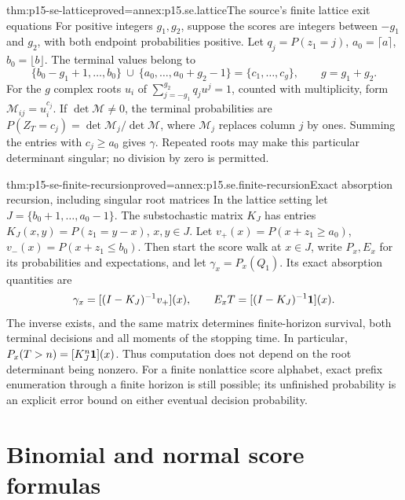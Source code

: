 \begin{hbtheorem}{thm:p15-se-lattice}{proved=annex:p15.se.lattice}{The source's finite lattice exit equations}
For positive integers \(g_1,g_2\), suppose the scores are integers
between \(-g_1\) and \(g_2\),
with both endpoint probabilities positive. Let \(q_j=P(z_1=j)\),
\(a_0=\lceil a\rceil\), \(b_0=\lfloor b\rfloor\).
The terminal values belong to
\[
 \{b_0-g_1+1,\ldots,b_0\}\ \cup\
 \{a_0,\ldots,a_0+g_2-1\}=\{c_1,\ldots,c_g\},
 \qquad g=g_1+g_2.
\]
For the \(g\) complex roots \(u_i\) of
\(\sum_{j=-g_1}^{g_2}q_j u^j=1\), counted with multiplicity,
form \(\mathcal M_{ij}=u_i^{c_j}\). If \(\det\mathcal M\ne0\), the terminal
probabilities are \(P(Z_T=c_j)=\det\mathcal M_j/\det\mathcal M\), where
\(\mathcal M_j\) replaces column \(j\) by ones. Summing the entries with
\(c_j\geq a_0\) gives \(\gamma\). Repeated roots may make this
particular determinant singular; no division by zero is permitted.
\cite[Equations (3.45)--(3.48)]{Wald1945SequentialTests}
\end{hbtheorem}

\begin{hbtheorem}{thm:p15-se-finite-recursion}{proved=annex:p15.se.finite-recursion}{Exact absorption recursion, including singular root matrices}
In the lattice setting let \(J=\{b_0+1,\ldots,a_0-1\}\).
The substochastic matrix \(K_J\) has entries
\(K_J(x,y)=P(z_1=y-x)\), \(x,y\in J\). Let
\(v_+(x)=P(x+z_1\geq a_0)\),
\(v_-(x)=P(x+z_1\leq b_0)\). Then
start the score walk at \(x\in J\), write \(P_x,E_x\) for its
probabilities and expectations, and let \(\gamma_x=P_x(Q_1)\).
Its exact absorption quantities are
\[
 \gamma_x=[(I-K_J)^{-1}v_+](x),\qquad
 E_xT=[(I-K_J)^{-1}{\bf1}](x).
\]
The inverse exists, and the same matrix determines finite-horizon
survival, both terminal decisions and all moments of the stopping time.
In particular, \(P_x(T>n)=[K_J^n{\bf1}](x)\).
Thus computation does not depend on the root determinant being nonzero.
For a finite nonlattice score alphabet, exact prefix enumeration through
a finite horizon is still possible; its unfinished probability is an
explicit error bound on either eventual decision probability.
\end{hbtheorem}

\section{Binomial and normal score formulas}
\label{sec:p15-se-score-families}

